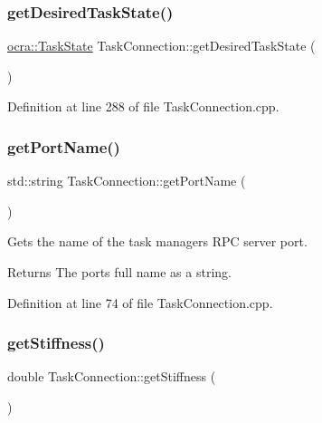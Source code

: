 \subsubsection{\texorpdfstring{get\+Desired\+Task\+State()}{getDesiredTaskState()}}
{\footnotesize\ttfamily \hyperlink{classocra_1_1TaskState}{ocra\+::\+Task\+State} Task\+Connection\+::get\+Desired\+Task\+State (\begin{DoxyParamCaption}{ }\end{DoxyParamCaption})}



Definition at line 288 of file Task\+Connection.\+cpp.

\hypertarget{classocra__recipes_1_1TaskConnection_a9898d85644f690d4b0e5d5a2c8338d63}{}\label{classocra__recipes_1_1TaskConnection_a9898d85644f690d4b0e5d5a2c8338d63} 
\subsubsection{\texorpdfstring{get\+Port\+Name()}{getPortName()}}
{\footnotesize\ttfamily std\+::string Task\+Connection\+::get\+Port\+Name (\begin{DoxyParamCaption}{ }\end{DoxyParamCaption})}

Gets the name of the task manager\textquotesingle{}s R\+PC server port.

\begin{DoxyReturn}{Returns}
The port\textquotesingle{}s full name as a string. 
\end{DoxyReturn}


Definition at line 74 of file Task\+Connection.\+cpp.

\hypertarget{classocra__recipes_1_1TaskConnection_a88bda0e9df65e379e1b7f5b89929fdde}{}\label{classocra__recipes_1_1TaskConnection_a88bda0e9df65e379e1b7f5b89929fdde} 
\subsubsection{\texorpdfstring{get\+Stiffness()}{getStiffness()}}
{\footnotesize\ttfamily double Task\+Connection\+::get\+Stiffness (\begin{DoxyParamCaption}{ }\end{DoxyParamCaption})}

